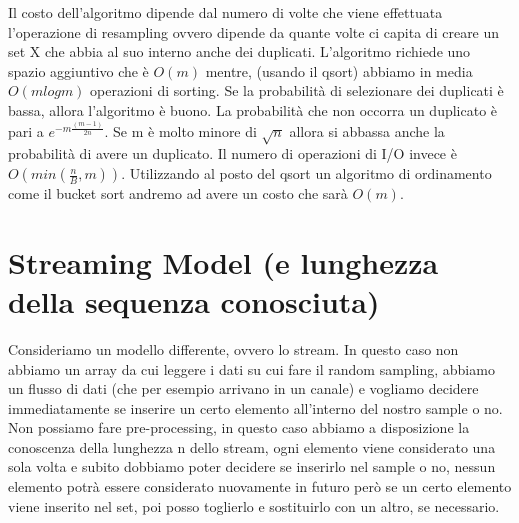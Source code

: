 \documentclass[14pt]{extreport}
\begin{document}
Il costo dell'algoritmo dipende dal numero di volte che viene effettuata l'operazione di resampling ovvero dipende da quante volte ci capita di creare un set X che abbia al suo interno anche dei duplicati.
L'algoritmo richiede uno spazio aggiuntivo che è $O(m)$ mentre, (usando il qsort) abbiamo in media $O(m logm)$ operazioni di sorting.
Se la probabilità di selezionare dei duplicati è bassa, allora l'algoritmo è buono. La probabilità che non occorra un duplicato è pari a $e^{-m\frac{(m-1)}{2n}}$. Se m è molto minore di $\sqrt{n}$ allora si abbassa anche la probabilità di avere un duplicato.
Il numero di operazioni di I/O invece è $O(min(\frac{n}{B},m))$.
Utilizzando al posto del qsort un algoritmo di ordinamento come il bucket sort andremo ad avere un costo che sarà $O(m)$.

\section{Streaming Model (e lunghezza della sequenza conosciuta)}

Consideriamo un modello differente, ovvero lo stream. In questo caso non abbiamo un array da cui leggere i dati su cui fare il random sampling, abbiamo un flusso di dati (che per esempio arrivano in un canale) e vogliamo decidere immediatamente se inserire un certo elemento all'interno del nostro sample o no.
Non possiamo fare pre-processing, in questo caso abbiamo a disposizione la conoscenza della lunghezza n dello stream, ogni elemento viene considerato una sola volta e subito dobbiamo poter decidere se inserirlo nel sample o no, nessun elemento potrà essere considerato nuovamente in futuro però se un certo elemento viene inserito nel set, poi posso toglierlo e sostituirlo con un altro, se necessario.
\end{document}
